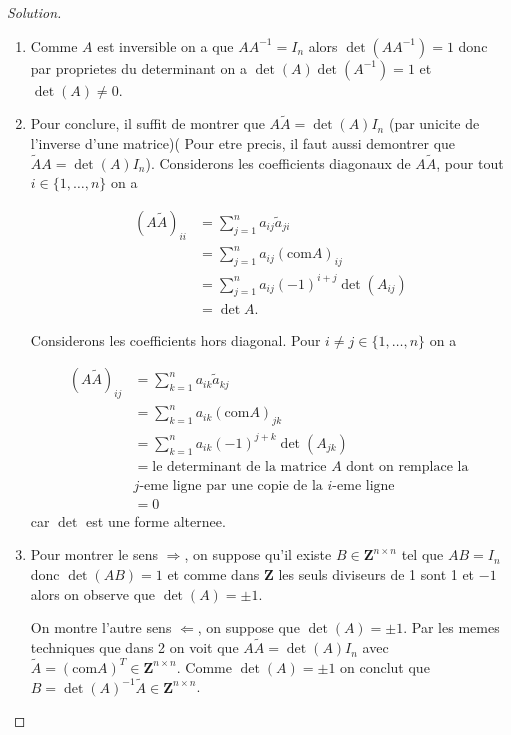 \documentclass[a4paper,11pt,french]{report}
\theoremstyle{plain}
\theoremstyle{definition}
\begin{document}
\begin{proof}[Solution]
\begin{enumerate}
\item Comme $A$ est inversible on a que $AA^{-1}=I_{n}$ alors $\det(AA^{-1})=1$ donc par proprietes du determinant on a $\det(A)\det (A^{-1})=1$ et $\det(A)\neq 0$.
\item Pour conclure, il suffit de montrer que $A\tilde{A}=\det(A)I_{n}$ (par unicite de l'inverse d'une matrice)( Pour etre precis, il faut aussi demontrer que $\tilde{A}A=\det(A)I_{n}$). Considerons les coefficients diagonaux de $A\tilde{A}$, pour tout $i\in \{ 1,\dots ,n \}$ on a 

\begin{align*}
(A\tilde{A})_{ii} & =\sum_{j=1}^{n} a_{ij}\tilde{a}_{ji} \\
 & =\sum_{j=1}^{n} a_{ij}(\mathrm{com}A)_{ij} \\
 & =\sum_{j=1}^{n} a_{ij}(-1)^{i+j}\det(A_{ij}) \\
 & =\det A.
\end{align*}

Considerons les coefficients hors diagonal. Pour $i\neq j\in \{ 1,\dots,n \}$ on a

\begin{align*}
(A\tilde{A})_{ij} & =\sum_{k=1}^{n} a_{ik}\tilde{a}_{kj} \\
 & =\sum_{k=1}^{n} a_{ik}(\mathrm{com}A)_{jk} \\
 & =\sum_{k=1}^{n} a_{ik}(-1)^{j+k}\det(A_{jk}) \\
 & =\text{le determinant de la matrice }A\text{ dont on remplace la }\\&j\text{-eme ligne par une copie de la }i\text{-eme ligne} \\
 & =0
\end{align*}
car $\det$ est une forme alternee.
\item Pour montrer le sens $\Rightarrow$, on suppose qu'il existe $B\in \mathbf{Z}^{n\times n}$ tel que $AB=I_{n}$ donc $\det(AB)=1$ et comme dans $\mathbf{Z}$ les seuls diviseurs de 1 sont 1 et $-1$ alors on observe que $\det(A)=\pm1$.

On montre l'autre sens $\Leftarrow$, on suppose que $\det(A)=\pm1$. Par les memes techniques que dans 2 on voit que $A\tilde{A}=\det(A)I_{n}$ avec $\tilde{A}=(\mathrm{com}A)^{T}\in \mathbf{Z}^{n\times n}$. Comme $\det(A)=\pm 1$ on conclut que $B=\det(A)^{-1}\tilde{A}\in \mathbf{Z}^{n\times n}$.
\end{enumerate}
\end{proof}
\end{document}
